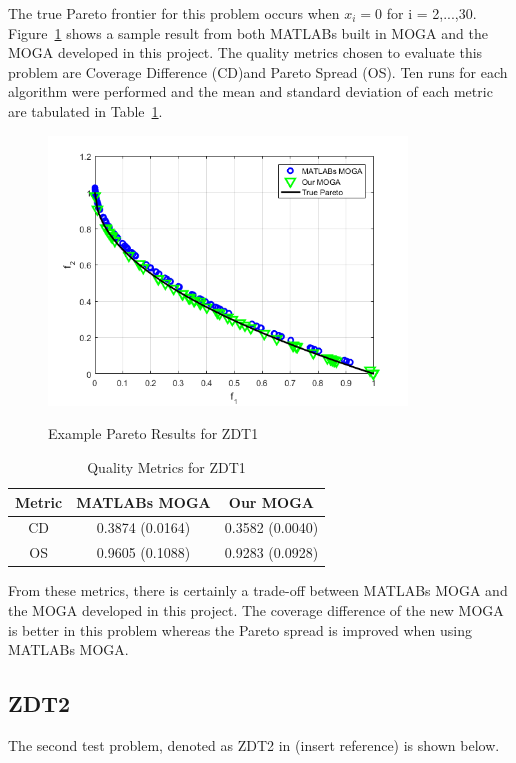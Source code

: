 \documentclass{article}
\begin{document}
The true Pareto frontier for this problem occurs when $x_i = 0$ for i = 2,...,30. Figure~\ref{fig:ZDT1} shows a sample result from both MATLABs built in MOGA and the MOGA developed in this project. The quality metrics chosen to evaluate this problem are Coverage Difference (CD)and Pareto Spread (OS). Ten runs for each algorithm were performed and the mean and standard deviation of each metric are tabulated in Table~\ref{tab:ZDT1}.
\begin{figure}[h]
  \caption{Example Pareto Results for ZDT1}
  \centering
  \includegraphics[width=0.85\textwidth]{ZDT1_pareto_final.png}  
  \label{fig:ZDT1}
\end{figure}

\begin{table}[h]
\caption{Quality Metrics for ZDT1} 
\centering 
\begin{tabular}{|c|c|c|} 
\hline\hline  
Metric & MATLABs MOGA & Our MOGA \\ \hline
CD & 0.3874 (0.0164) &  0.3582 (0.0040) \\ \hline
OS & 0.9605 (0.1088) & 0.9283 (0.0928) \\ \hline
\end{tabular}
\label{tab:ZDT1} 
\end{table}
From these metrics, there is certainly a trade-off between MATLABs MOGA and the MOGA developed in this project. The coverage difference of the new MOGA is better in this problem whereas the Pareto spread is improved when using MATLABs MOGA. 

\subsection{ZDT2} 
The second test problem, denoted as ZDT2 in (insert reference) is shown below. 
\end{document}
